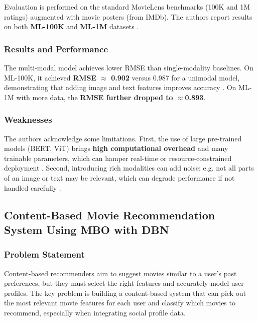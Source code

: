 Evaluation is performed on the standard MovieLens benchmarks (100K and 1M ratings) augmented with movie posters (from IMDb). The authors report results on both \textbf{ML-100K} and \textbf{ML-1M} datasets \cite{xia2024poster}.



\subsubsection{Results and Performance}

The multi-modal model achieves lower RMSE than single-modality baselines. On ML-100K, it achieved \textbf{RMSE $\approx$ 0.902} versus 0.987 for a unimodal model, demonstrating that adding image and text features improves accuracy \cite{xia2024poster}. On ML-1M with more data, the \textbf{RMSE further dropped to $\approx$0.893}.



\subsubsection{Weaknesses}

The authors acknowledge some limitations. First, the use of large pre-trained models (BERT, ViT) brings \textbf{high computational overhead} and many trainable parameters, which can hamper real-time or resource-constrained deployment \cite{xia2024poster}. Second, introducing rich modalities can add noise: e.g. not all parts of an image or text may be relevant, which can degrade performance if not handled carefully \cite{xia2024poster}.



\subsection{Content-Based Movie Recommendation System Using MBO with DBN}

\subsubsection{Problem Statement}

Content-based recommenders aim to suggest movies similar to a user’s past preferences, but they must select the right features and accurately model user profiles. The key problem is building a content-based system that can pick out the most relevant movie features for each user and classify which movies to recommend, especially when integrating social profile data.



